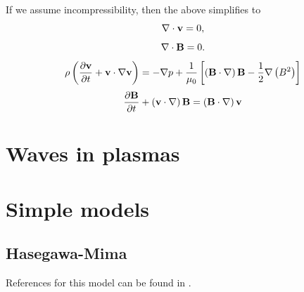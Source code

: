 \documentclass[oneside,a4paper,11pt]{report}
\begin{document}
If we assume incompressibility, then the above simplifies to
\begin{equation}
    \nabla \cdot \mathbf{v} = 0,
\end{equation}
\begin{equation}
    \nabla \cdot \mathbf{B} = 0.
    \end{equation}
\begin{equation}
    \rho \left (\frac{\partial \mathbf{v}}{\partial t} + \mathbf{v} \cdot \nabla \mathbf{v} \right ) = - \nabla p  + \frac{1}{\mu_0} \left [ \left ( \mathbf{B} \cdot \nabla \right ) \mathbf{B} - \frac{1}{2} \nabla \left ( B^2 \right ) \right ]
\end{equation}
\begin{equation}
    \frac{\partial \mathbf{B}}{\partial t} + \left ( \mathbf{v} \cdot \nabla \right ) \mathbf{B} = \left ( \mathbf{B} \cdot \nabla \right ) \mathbf{v}
\end{equation}

\chapter{Waves in plasmas}

\chapter{Simple models}
\section{Hasegawa-Mima}
References for this model can be found in \cite{hasegawa1977,horton1994}.

\end{document}
